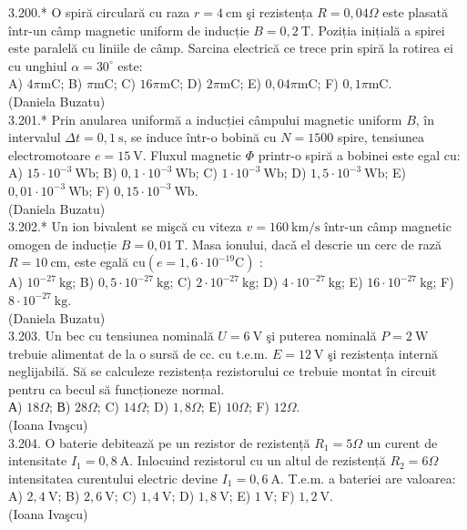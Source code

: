 \documentclass[10pt]{article}
\begin{document}
3.200.* O spiră circulară cu raza $r=4 \mathrm{~cm}$ şi rezistența $R=0,04 \Omega$ este plasată într-un câmp magnetic uniform de inducție $B=0,2 \mathrm{~T}$. Poziția inițială a spirei este paralelă cu liniile de câmp. Sarcina electrică ce trece prin spiră la rotirea ei cu unghiul $\alpha=30^{\circ}$ este:\\ A) $4 \pi \mathrm{mC}$; B) $\pi \mathrm{mC}$; C) $16 \pi \mathrm{mC}$; D) $2 \pi \mathrm{mC}$; E) $0,04 \pi \mathrm{mC}$; F) $0,1 \pi \mathrm{mC}$.\\ (Daniela Buzatu)\\

3.201.* Prin anularea uniformă a inducției câmpului magnetic uniform $B$, în intervalul $\Delta t=0,1 \mathrm{~s}$, se induce într-o bobină cu $N=1500$ spire, tensiunea electromotoare $e=15 \mathrm{~V}$. Fluxul magnetic $\Phi$ printr-o spiră a bobinei este egal cu:\\ A) $15 \cdot 10^{-3} \mathrm{~Wb}$; B) $0,1 \cdot 10^{-3} \mathrm{~Wb}$; C) $1 \cdot 10^{-3} \mathrm{~Wb}$; D) $1,5 \cdot 10^{-3} \mathrm{~Wb}$; E) $0,01 \cdot 10^{-3} \mathrm{~Wb}$; F) $0,15 \cdot 10^{-3} \mathrm{~Wb}$.\\ (Daniela Buzatu)\\

3.202.* Un ion bivalent se mişcă cu viteza $v=160 \mathrm{~km} / \mathrm{s}$ într-un câmp magnetic omogen de inducție $B=0,01 \mathrm{~T}$. Masa ionului, dacǎ el descrie un cerc de rază $R=10 \mathrm{~cm}$, este egală $\mathrm{cu}\left(e=1,6 \cdot 10^{-19} \mathrm{C}\right)$ :\\ A) $10^{-27} \mathrm{~kg}$; B) $0,5 \cdot 10^{-27} \mathrm{~kg}$; C) $2 \cdot 10^{-27} \mathrm{~kg}$; D) $4 \cdot 10^{-27} \mathrm{~kg}$; E) $16 \cdot 10^{-27} \mathrm{~kg}$; F) $8 \cdot 10^{-27} \mathrm{~kg}$.\\ (Daniela Buzatu)\\

3.203. Un bec cu tensiunea nominală $U=6 \mathrm{~V}$ şi puterea nominală $P=2 \mathrm{~W}$ trebuie alimentat de la o sursă de cc. cu t.e.m. $E=12 \mathrm{~V}$ şi rezistența internă neglijabilă. Să se calculeze rezistența rezistorului ce trebuie montat în circuit pentru ca becul să funcționeze normal.\\ А) $18 \Omega$; В) $28 \Omega$; C) $14 \Omega$; D) $1,8 \Omega$; Е) $10 \Omega$; F) $12 \Omega$.\\ (Ioana Ivaşcu)\\

3.204. O baterie debitează pe un rezistor de rezistență $R_{1}=5 \Omega$ un curent de intensitate $I_{1}=0,8 \mathrm{~A}$. Inlocuind rezistorul cu un altul de rezistență $R_{2}=6 \Omega$ intensitatea curentului electric devine $I_{1}=0,6 \mathrm{~A}$. T.e.m. a bateriei are valoarea:\\ A) $2,4 \mathrm{~V}$; B) $2,6 \mathrm{~V}$; C) $1,4 \mathrm{~V}$; D) $1,8 \mathrm{~V}$; E) $1 \mathrm{~V}$; F) $1,2 \mathrm{~V}$.\\ (Ioana Ivaşcu)\\
\end{document}
